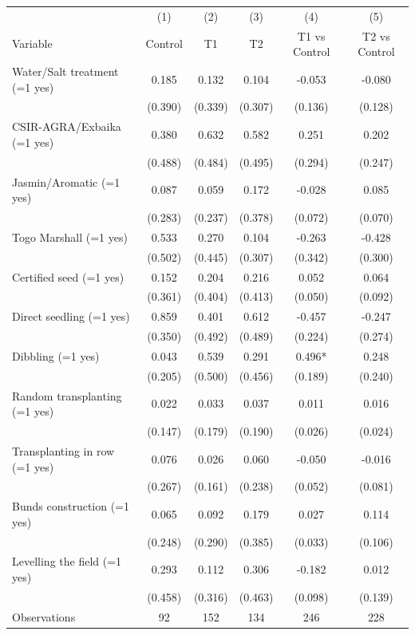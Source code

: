 \begin{tabular}{l*{5}c}
\hline\hline
 & (1) & (2) & (3) & (4) & (5) \\
Variable & Control & T1 & T2 & T1 vs Control & T2 vs Control \\
\hline
Water/Salt treatment (=1 yes)&0.185&0.132&0.104&-0.053&-0.080\\
&(0.390)&(0.339)&(0.307)&(0.136)&(0.128)\\
CSIR-AGRA/Exbaika (=1 yes)&0.380&0.632&0.582&0.251&0.202\\
&(0.488)&(0.484)&(0.495)&(0.294)&(0.247)\\
Jasmin/Aromatic (=1 yes)&0.087&0.059&0.172&-0.028&0.085\\
&(0.283)&(0.237)&(0.378)&(0.072)&(0.070)\\
Togo Marshall (=1 yes)&0.533&0.270&0.104&-0.263&-0.428\\
&(0.502)&(0.445)&(0.307)&(0.342)&(0.300)\\
Certified seed (=1 yes)&0.152&0.204&0.216&0.052&0.064\\
&(0.361)&(0.404)&(0.413)&(0.050)&(0.092)\\
Direct seedling (=1 yes)&0.859&0.401&0.612&-0.457&-0.247\\
&(0.350)&(0.492)&(0.489)&(0.224)&(0.274)\\
Dibbling (=1 yes)&0.043&0.539&0.291&0.496*&0.248\\
&(0.205)&(0.500)&(0.456)&(0.189)&(0.240)\\
Random transplanting (=1 yes)&0.022&0.033&0.037&0.011&0.016\\
&(0.147)&(0.179)&(0.190)&(0.026)&(0.024)\\
Transplanting in row (=1 yes)&0.076&0.026&0.060&-0.050&-0.016\\
&(0.267)&(0.161)&(0.238)&(0.052)&(0.081)\\
Bunds construction (=1 yes)&0.065&0.092&0.179&0.027&0.114\\
&(0.248)&(0.290)&(0.385)&(0.033)&(0.106)\\
Levelling the field (=1 yes)&0.293&0.112&0.306&-0.182&0.012\\
&(0.458)&(0.316)&(0.463)&(0.098)&(0.139)\\
\hline
Observations & 92 & 152 & 134 & 246 & 228 \\
\hline\hline
\end{tabular}
